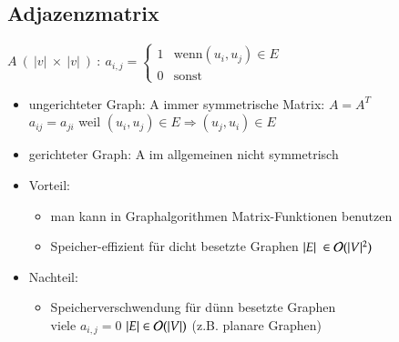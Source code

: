     \subsection*{Adjazenzmatrix}
     $ A\  (\ |v|\ \times \ |v|\ )\ :\  a_{i,j} = \begin{cases} 1 & \text{wenn} (u_i, u_j) \in E \\
    0  & \text{sonst}\end{cases}$
    \begin{itemize}
        \item ungerichteter Graph: A immer symmetrische Matrix: $A = A^T$ \\
        \hspace*{1cm} $a_{ij} = a_{ji}$ \hspace*{2mm} weil \hspace*{2mm} $(u_i, u_j) \in E \Rightarrow (u_j, u_i) \in E$
        \item gerichteter Graph: A im allgemeinen nicht symmetrisch
        \item Vorteil:
        \begin{itemize}
            \item man kann in Graphalgorithmen Matrix-Funktionen benutzen
            \item Speicher-effizient für dicht besetzte Graphen $| E | \ \in \mathcal{O}{}(|V|^2)$
        \end{itemize}
        \item Nachteil:
        \begin{itemize}
            \item Speicherverschwendung für dünn besetzte Graphen \\
            viele $a_{i,j} = 0$ \hspace*{1cm} $|E| \in \mathcal{O}{}(|V|)$ \hspace*{1cm} (z.B. planare Graphen)
        \end{itemize}
    \end{itemize}

